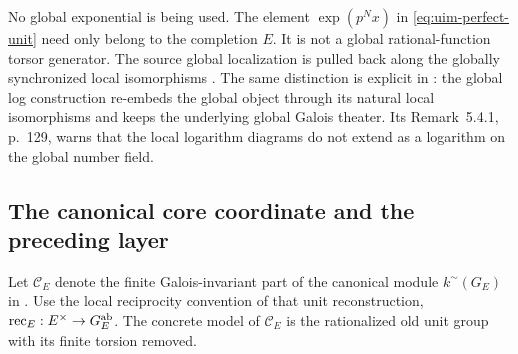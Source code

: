 No global exponential is being used. The element
\(\exp(p^Nx)\) in \eqref{eq:uim-perfect-unit}
need only belong to the completion \(E\).
It is not a global rational-function torsor
generator. The source global localization is
pulled back along the globally synchronized
local isomorphisms
\cite[Proposition~3.3]{IUT3}.
The same distinction is explicit in
\cite[Definition~5.4(ii), pp.~125--126]{MochizukiAbsTopIII2015}:
the global log construction re-embeds the
global object through its natural local
isomorphisms and keeps the underlying global
Galois theater. Its Remark~5.4.1, p.~129,
warns that the local logarithm diagrams
do not extend as a logarithm on the global
number field.

\subsection{The canonical core coordinate and the preceding layer}

Let \(\mathcal C_E\) denote the finite
Galois-invariant part of the canonical module
\(k^\sim(G_E)\) in
\cite[Proposition~5.8(ii), p.~139]{MochizukiAbsTopIII2015}.
Use the local reciprocity convention of that
unit reconstruction,
\(\operatorname{rec}_E:E^\times\to G_E^{\rm ab}\).
The concrete model of \(\mathcal C_E\) is the
rationalized old unit group with its finite
torsion removed.

